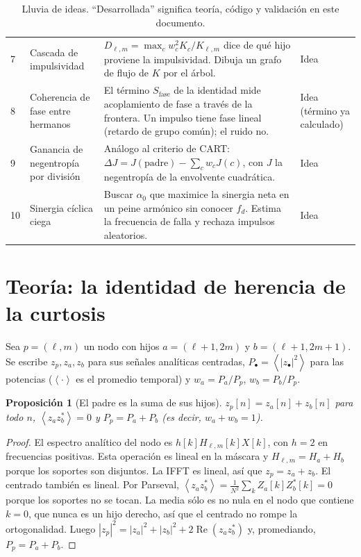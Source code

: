 \documentclass[11pt,a4paper]{article}
\newtheorem{proposicion}{Proposición}
\theoremstyle{definition}
\theoremstyle{remark}
\newcommand{\ip}[1]{\left\langle #1 \right\rangle}
\renewcommand{\Re}{\operatorname{Re}}
\begin{document}
\begin{table}[!htb]
\begin{tabularx}{\textwidth}{@{}p{0.3cm}p{3.6cm}Xp{2.1cm}@{}}
7 & Cascada de impulsividad & $D_{\ell,m}=\max_c w_c^2K_c/K_{\ell,m}$ dice de qué hijo proviene la impulsividad. Dibuja un grafo de flujo de $K$ por el árbol. & Idea \\
8 & Coherencia de fase entre hermanos & El término $S_{\text{fase}}$ de la identidad mide acoplamiento de fase a través de la frontera. Un impulso tiene fase lineal (retardo de grupo común); el ruido no. & Idea (término ya calculado) \\
9 & Ganancia de negentropía por división & Análogo al criterio de CART: $\Delta J=J(\text{padre})-\sum_c w_cJ(c)$, con $J$ la negentropía de la envolvente cuadrática. & Idea \\
10 & Sinergia cíclica ciega & Buscar $\alpha_0$ que maximice la sinergia neta en un peine armónico sin conocer $f_d$. Estima la frecuencia de falla y rechaza impulsos aleatorios. & Idea \\
\bottomrule
\end{tabularx}
\caption{Lluvia de ideas. ``Desarrollada'' significa teoría, código y validación en este documento.}
\label{tab:ideas}
\end{table}

\section{Teoría: la identidad de herencia de la curtosis}\label{sec:teoria}
Sea $p=(\ell,m)$ un nodo con hijos $a=(\ell+1,2m)$ y $b=(\ell+1,2m+1)$. Se escribe $z_p,z_a,z_b$ para sus señales analíticas centradas, $P_\bullet=\ip{|z_\bullet|^2}$ para las potencias ($\ip{\cdot}$ es el promedio temporal) y $w_a=P_a/P_p$, $w_b=P_b/P_p$.

\begin{proposicion}[El padre es la suma de sus hijos]\label{prop:suma}
$z_p[n]=z_a[n]+z_b[n]$ para todo $n$, $\ip{z_az_b^*}=0$ y $P_p=P_a+P_b$ (es decir, $w_a+w_b=1$).
\end{proposicion}
\begin{proof}
El espectro analítico del nodo es $h[k]H_{\ell,m}[k]X[k]$, con $h=2$ en frecuencias positivas. Esta operación es lineal en la máscara y $H_{\ell,m}=H_{a}+H_{b}$ porque los soportes son disjuntos. La IFFT es lineal, así que $z_p=z_a+z_b$. El centrado también es lineal. Por Parseval, $\ip{z_az_b^*}=\frac1{N^2}\sum_k Z_a[k]Z_b^*[k]=0$ porque los soportes no se tocan. La media sólo es no nula en el nodo que contiene $k=0$, que nunca es un hijo derecho, así que el centrado no rompe la ortogonalidad. Luego $|z_p|^2=|z_a|^2+|z_b|^2+2\Re(z_az_b^*)$ y, promediando, $P_p=P_a+P_b$.
\end{proof}
\end{document}

